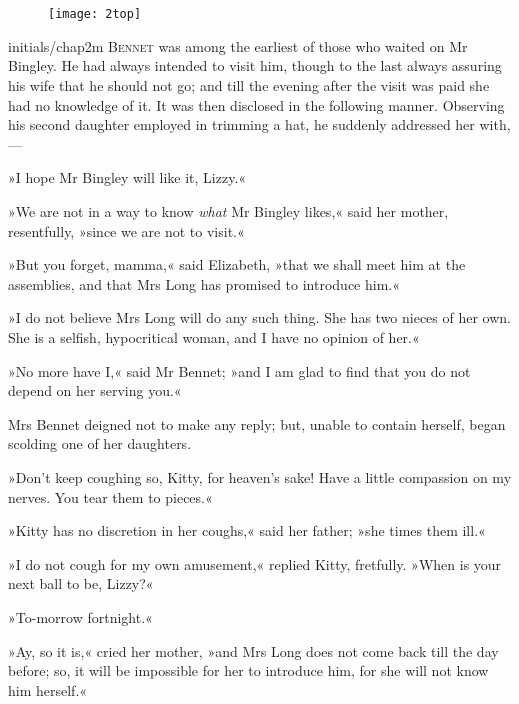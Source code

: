 
 \chapter[Chapter \thechapter]{}

\begin{figure}[t!]
\centering
\texttt{[image: 2top]}
\end{figure}

 \lettrine[lines=6,image=true,findent=5pt]{initials/chap2m}{ Bennet} was among the earliest of those who waited on Mr Bingley. He had always intended to visit him, though to the last always assuring his wife that he should not go; and till the evening after the visit was paid she had no knowledge of it. It was then disclosed in the following manner. Observing his second daughter employed in trimming a hat, he suddenly addressed her with,—

»I hope Mr Bingley will like it, Lizzy.«

»We are not in a way to know \textit{what} Mr Bingley likes,« said her mother, resentfully, »since we are not to visit.«

»But you forget, mamma,« said Elizabeth, »that we shall meet him at the assemblies, and that Mrs Long has promised to introduce him.«

»I do not believe Mrs Long will do any such thing. She has two nieces of her own. She is a selfish, hypocritical woman, and I have no opinion of her.«

»No more have I,« said Mr Bennet; »and I am glad to find that you do not depend on her serving you.«

Mrs Bennet deigned not to make any reply; but, unable to contain herself, began scolding one of her daughters.

»Don't keep coughing so, Kitty, for heaven's sake! Have a little compassion on my nerves. You tear them to pieces.«

»Kitty has no discretion in her coughs,« said her father; »she times them ill.«

»I do not cough for my own amusement,« replied Kitty, fretfully. »When is your next ball to be, Lizzy?«

»To-morrow fortnight.«

»Ay, so it is,« cried her mother, »and Mrs Long does not come back till the day before; so, it will be impossible for her to introduce him, for she will not know him herself.«

